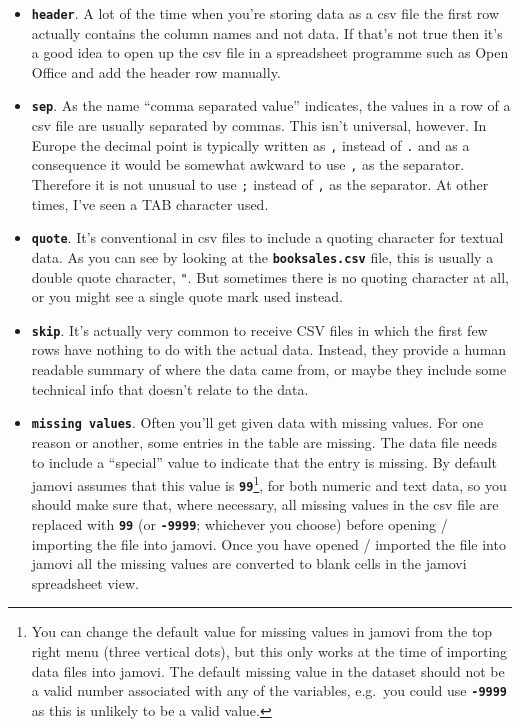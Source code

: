 \documentclass[
]{book}
\providecommand{\tightlist}{%
  \setlength{\itemsep}{0pt}\setlength{\parskip}{0pt}}
\begin{document}
\begin{itemize}
\tightlist
\item
  \textbf{\texttt{header}}. A lot of the time when you're storing data as a csv file the first row actually contains the column names and not data. If that's not true then it's a good idea to open up the csv file in a spreadsheet programme such as Open Office and add the header row manually.
\item
  \textbf{\texttt{sep}}. As the name ``comma separated value'' indicates, the values in a row of a csv file are usually separated by commas. This isn't universal, however. In Europe the decimal point is typically written as \texttt{,} instead of \texttt{.} and as a consequence it would be somewhat awkward to use \texttt{,} as the separator. Therefore it is not unusual to use \texttt{;} instead of \texttt{,} as the separator. At other times, I've seen a TAB character used.
\item
  \textbf{\texttt{quote}}. It's conventional in csv files to include a quoting character for textual data. As you can see by looking at the \textbf{\texttt{booksales.csv}} file, this is usually a double quote character, \texttt{"}. But sometimes there is no quoting character at all, or you might see a single quote mark \texttt{\textquotesingle{}} used instead.
\item
  \textbf{\texttt{skip}}. It's actually very common to receive CSV files in which the first few rows have nothing to do with the actual data. Instead, they provide a human readable summary of where the data came from, or maybe they include some technical info that doesn't relate to the data.
\item
  \textbf{\texttt{missing\ values}}. Often you'll get given data with missing values. For one reason or another, some entries in the table are missing. The data file needs to include a ``special'' value to indicate that the entry is missing. By default jamovi assumes that this value is \textbf{\texttt{99}}\footnote{You can change the default value for missing values in jamovi from the top right menu (three vertical dots), but this only works at the time of importing data files into jamovi. The default missing value in the dataset should not be a valid number associated with any of the variables, e.g.~you could use \textbf{\texttt{-9999}} as this is unlikely to be a valid value.}, for both numeric and text data, so you should make sure that, where necessary, all missing values in the csv file are replaced with \textbf{\texttt{99}} (or \textbf{\texttt{-9999}}; whichever you choose) before opening / importing the file into jamovi. Once you have opened / imported the file into jamovi all the missing values are converted to blank cells in the jamovi spreadsheet view.
\end{itemize}
\end{document}
